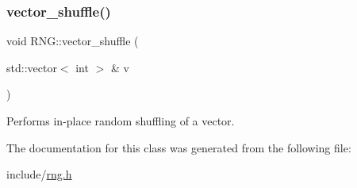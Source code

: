 \subsubsection{\texorpdfstring{vector\+\_\+shuffle()}{vector\_shuffle()}}
{\footnotesize\ttfamily void R\+N\+G\+::vector\+\_\+shuffle (\begin{DoxyParamCaption}\item[{std\+::vector$<$ int $>$ \&}]{v }\end{DoxyParamCaption})\hspace{0.3cm}{\ttfamily [inline]}}



Performs in-\/place random shuffling of a vector. 



The documentation for this class was generated from the following file\+:\begin{DoxyCompactItemize}
\item 
include/\hyperlink{rng_8h}{rng.\+h}\end{DoxyCompactItemize}
